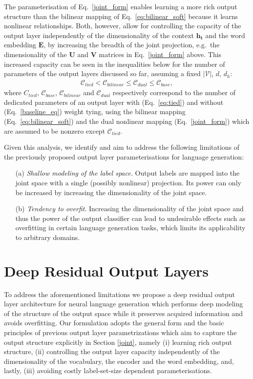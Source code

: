 \documentclass{article}
\begin{document}
The parameterisation of Eq.~\ref{joint_form} enables learning a more rich output structure than the bilinear mapping of Eq.~\ref{eq:bilinear_soft} because it learns nonlinear relationships.  Both, however, allow for controlling the capacity of the output layer independently of the dimensionality of the context $\mathbf{h_t}$ and the word embedding $\mathbf{E}$, by increasing the breadth of the joint projection, e.g.~the dimensionality of the $\mathbf{U}$ and $\mathbf{V}$ matrices in Eq.~\ref{joint_form} above. This increased capacity can be seen in the inequalities below for the number of parameters of the output layers discussed so far, assuming a fixed $|\mathcal{V}|$, $d$, $d_{h}$:
\begin{align}
\mathcal{C}_{tied} < \mathcal{C}_{bilinear} \leq \mathcal{C}_{dual} \leq \mathcal{C}_{base},
\label{capacity_ineq}
\end{align}
where ${C}_{tied}$,  $\mathcal{C}_{base}$,  $\mathcal{C}_{bilinear}$ and $\mathcal{C}_{dual}$ respectively correspond to the number of dedicated parameters of an  output layer with (Eq.~\ref{eq:tied}) and without (Eq.~\ref{baseline_eq}) weight tying, using the bilinear mapping (Eq.~\ref{eq:bilinear_soft}) and the dual nonlinear mapping (Eq.~\ref{joint_form}) which are assumed to be nonzero except $\mathcal{C}_{tied}$. 
    
Given this analysis, we identify and aim to address the following limitations of the previously proposed output layer parameterisations for language generation: \
\begin{itemize}
    \item[(a)] \textit{Shallow modeling of the label space.} Output labels are mapped into the joint space with a single (possibly nonlinear) projection.  Its power can only be increased by increasing the dimensionality of the joint space.
    \item[(b)] \textit{Tendency to overfit}. Increasing the dimensionality of the joint space and thus the power of the output classifier can lead to undesirable effects such as overfitting in certain language generation tasks, which limits its applicability to arbitrary domains.   
\end{itemize}  
 


\section{Deep Residual Output Layers} 
\label{model}
To address the aforementioned limitations we propose a deep residual output layer architecture for neural language generation which performs deep modeling of the structure of the output space while it preserves acquired information and avoids overfitting. Our formulation adopts the general form and the basic principles of previous output layer parametrizations which aim to capture the output structure explicitly in Section \ref{joint}, namely (i) learning rich output structure, (ii) controlling the output layer capacity independently of the dimensionality of the vocabulary, the encoder and the word embedding, and, lastly, (iii)  avoiding costly label-set-size dependent parameterisations.  
\end{document}
